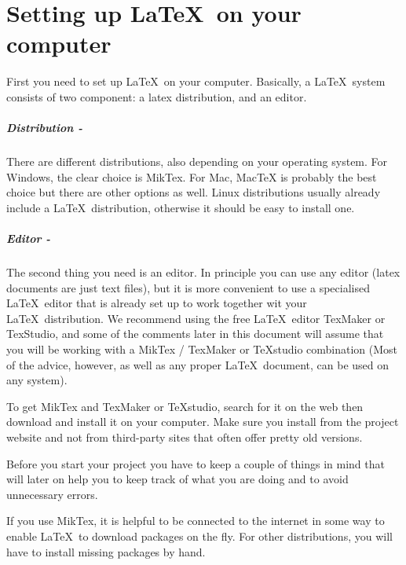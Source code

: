 \documentclass[justified, notoc]{tufte-book} %
\begin{document}
\chapter{Setting up \LaTeX\ on your computer}

First you need to set up \LaTeX\ on your computer. Basically, a \LaTeX\ system consists of two component: a latex distribution, and an editor.

\paragraph{Distribution -}There are different distributions, also depending on your operating system. For Windows, the clear choice is MikTex. For Mac, MacTeX is probably the best choice but there are other options as well. Linux distributions usually already include a \LaTeX\ distribution, otherwise it should be easy to install one. 

\paragraph{Editor -}The second thing you need is an editor. In principle you can use any editor (latex documents are just text files), but it is more convenient to use a specialised \LaTeX\  editor that is already set up to work together wit your \LaTeX\ distribution.  We recommend using the free \LaTeX\ editor TexMaker or TexStudio, and some of the comments later in this document will assume that you will be working with a MikTex / TexMaker or TeXstudio combination (Most of the advice, however, as well as any proper \LaTeX\ document, can be used on any system).

To get MikTex and TexMaker or TeXstudio, search for it on the web then download and install it on your computer. Make sure you install from the project website and not from third-party sites that often offer pretty old versions. 
  
Before you start your project you have to keep a couple of things in mind that will later on help you to keep track of what you are doing and to avoid unnecessary errors.
 
If you use MikTex, it is helpful to be connected to the internet in some way to enable \LaTeX\ to download packages on the fly. For other distributions, you will have to install missing packages by hand. 
\end{document}
